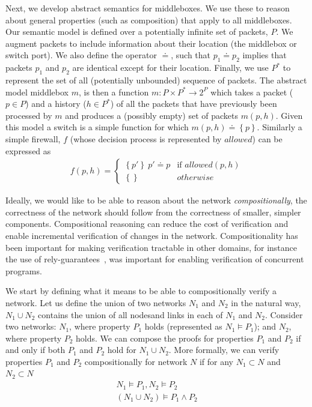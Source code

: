Next, we develop abstract semantics for middleboxes. We use these to reason about general properties (such as composition) that apply to all middleboxes. Our semantic model is defined over a potentially infinite set of packets, $P$.  We augment packets to include information about their location (\ie the
middlebox or
switch port). We also define the operator $\doteq$, such that $p_1 \doteq p_2$ implies that packets $p_1$ and $p_2$ are identical except for their location.
Finally, we use $P^*$ to represent the set of all (potentially unbounded) sequence of packets.
The abstract model middlebox $m$, is then a function $m\colon P\times P^* \to 2^P$ which takes a packet ($p\in P$) and a history ($h\in P^*$) 
of all the packets that have
previously been processed by $m$ and produces a (possibly empty) set of packets $m(p, h)$. Given this model a switch is a simple function for which
$m(p, h) \doteq \left\{p\right\}$. Similarly a simple firewall, $f$ (whose decision process is represented by $allowed$) can be expressed as
\begin{align*}
 f(p, h) = \begin{cases}
    \left\{p'\right\}\ p' \doteq p & \mbox{if } allowed(p, h)\\
    \left\{\right\} & otherwise
 \end{cases}
\end{align*}

Ideally, we would like to be able to reason about the network \emph{compositionally}, \ie the correctness of the network should follow from
the correctness of smaller, simpler components. Compositional reasoning can reduce the cost of verification and enable incremental verification
of changes in the network. Compositionality has been important for making verification tractable in other domains, for instance the use of
rely-guarantees~\cite{tse:MisraC81,ifip:Jones83}, was important for enabling verification of concurrent programs.

We start by defining what it means to be able to compositionally verify a network. Let us
define the union of two networks $N_1$ and $N_2$ in the natural way, \ie $N_1\cup N_2$ contains the union of all nodesand links in each of $N_1$ and $N_2$.
Consider two networks: $N_1$, where property $P_1$ holds (represented as $N_1\models P_1$); and $N_2$, where property $P_2$ holds. We can compose the proofs
for properties $P_1$ and $P_2$ if and only if  both $P_1$ and $P_2$ hold for $N_1 \cup N_2$. More formally, we can verify properties $P_1$ and $P_2$
compositionally for network $N$ if for any $N_1 \subset N$ and $N_2\subset N$
\begin{align*}
N_1 \models P_1,  N_2\models P_2\\
\hline
(N_1 \cup N_2) \models P_1\land P_2
\end{align*}

